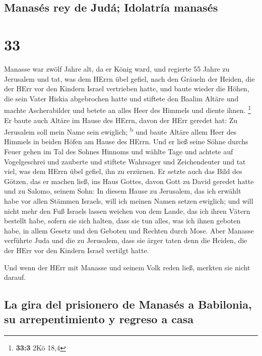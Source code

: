 \hypertarget{manasuxe9s-rey-de-juduxe1-idolatruxeda-manasuxe9s}{%
\subsection{Manasés rey de Judá; Idolatría
manasés}\label{manasuxe9s-rey-de-juduxe1-idolatruxeda-manasuxe9s}}

\hypertarget{section-32}{%
\section{33}\label{section-32}}

 Manasse war zwölf Jahre alt, da er König ward, und
regierte 55 Jahre zu Jerusalem  und tat, was dem HErrn
übel gefiel, nach den Gräueln der Heiden, die der HErr vor den Kindern
Israel vertrieben hatte,  und baute wieder die Höhen, die
sein Vater Hiskia abgebrochen hatte und stiftete den Baalim Altäre und
machte Ascherabilder und betete an alles Heer des Himmels und diente
ihnen. \footnote{\textbf{33:3} 2Kö 18,4}  Er baute auch
Altäre im Hause des HErrn, davon der HErr geredet hat: Zu Jerusalem soll
mein Name sein ewiglich; \textsuperscript{b}  und baute
Altäre allem Heer des Himmels in beiden Höfen am Hause des HErrn.
 Und er ließ seine Söhne durchs Feuer gehen im Tal des
Sohnes Hinnoms und wählte Tage und achtete auf Vogelgeschrei und
zauberte und stiftete Wahrsager und Zeichendeuter und tat viel, was dem
HErrn übel gefiel, ihn zu erzürnen.  Er setzte auch das
Bild des Götzen, das er machen ließ, ins Haus Gottes, davon Gott zu
David geredet hatte und zu Salomo, seinem Sohn: In diesem Hause zu
Jerusalem, das ich erwählt habe vor allen Stämmen Israels, will ich
meinen Namen setzen ewiglich;  und will nicht mehr den Fuß
Israels lassen weichen von dem Lande, das ich ihren Vätern bestellt
habe, sofern sie sich halten, dass sie tun alles, was ich ihnen geboten
habe, in allem Gesetz und den Geboten und Rechten durch Mose.
 Aber Manasse verführte Juda und die zu Jerusalem, dass
sie ärger taten denn die Heiden, die der HErr vor den Kindern Israel
vertilgt hatte.

 Und wenn der HErr mit Manasse und seinem Volk reden
ließ, merkten sie nicht darauf.

\hypertarget{la-gira-del-prisionero-de-manasuxe9s-a-babilonia-su-arrepentimiento-y-regreso-a-casa}{%
\subsection{La gira del prisionero de Manasés a Babilonia, su
arrepentimiento y regreso a
casa}\label{la-gira-del-prisionero-de-manasuxe9s-a-babilonia-su-arrepentimiento-y-regreso-a-casa}}

